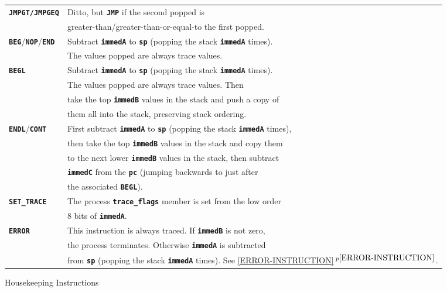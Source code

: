 \documentclass[12pt]{article}
\newcommand{\TT}[1]{{\tt \bfseries #1}}
\newcommand{\itemref}[1]{\ref{#1}$\,^{p\pageref{#1}}$}
\newlength{\figurewidth}
\newenvironment{boxedfigure}[1][!btp]%
	{\begin{figure*}[#1]
	 \begin{lrbox}{\figurebox}
	 \begin{minipage}{\figurewidth}

	 \vspace*{1ex}}%
	{
	 \vspace*{1ex}

	 \end{minipage}
	 \end{lrbox}

	 \centering
	 \fbox{\hspace*{0.1in}\usebox{\figurebox}\hspace*{0.1in}}
	 \end{figure*}}
\begin{document}
\begin{boxedfigure}
\begin{center}
\begin{tabular}{|l|l|}
\TT{JMPGT/JMPGEQ}
    & Ditto, but \TT{JMP} if the second popped is \\
    & greater-than/greater-than-or-equal-to the first popped.
\\\hline
\TT{BEG}/\TT{NOP}/\TT{END}
    & Subtract \TT{immedA} to \TT{sp} (popping the stack \TT{immedA} times). \\
    & The values popped are always trace values.
\\\hline
\TT{BEGL}
    & Subtract \TT{immedA} to \TT{sp} (popping the stack \TT{immedA} times). \\
    & The values popped are always trace values.  Then \\
    & take the top \TT{immedB} values in the stack and push a copy of \\
    & them all into the stack, preserving stack ordering.
\\\hline
\TT{ENDL}/\TT{CONT}
    & First subtract \TT{immedA} to \TT{sp}
      (popping the stack \TT{immedA} times), \\
    & then take the top \TT{immedB} values in the stack and copy them \\
    & to the next lower \TT{immedB} values in the stack, then subtract \\
    & \TT{immedC} from the \TT{pc} (jumping backwards to just after \\
    & the associated \TT{BEGL}).
\\\hline
\TT{SET\_TRACE}
    & The process \TT{trace\_flags} member is set from the low order \\
    & 8 bits of \TT{immedA}.
\\\hline
\TT{ERROR}
    & This instruction is always traced.  If \TT{immedB} is not zero, \\
    & the process terminates.
      Otherwise \TT{immedA} is subtracted \\
    & from \TT{sp} (popping the stack \TT{immedA} times).
      See \itemref{ERROR-INSTRUCTION}.
\\\hline
\end{tabular}
\end{center}
\vspace*{-3ex}
\caption{Housekeeping Instructions}
\label{HOUSEKEEPING-INSTRUCTIONS}
\end{boxedfigure}
\end{document}
